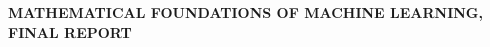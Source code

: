 \makeatletter
\begin{titlepage}
\begin{center}

\uppercase{\textbf{\large{Mathematical foundations of machine learning, Final Report}}}
\\[7cm]

\uppercase{\textbf{\large{\@title}}}

\vfill
\@author
\\[3cm]


\@date

\end{center}
\end{titlepage}
\makeatother